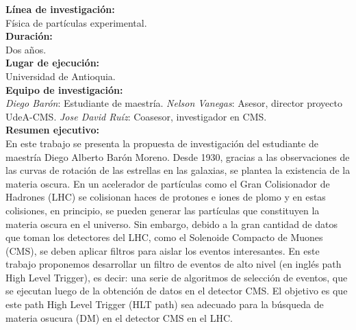 \textbf{Línea de investigación:}\\
Física de partículas experimental.
\\

\textbf{Duración:}\\
Dos años.
\\

\textbf{Lugar de ejecución:}\\
Universidad de Antioquia.
\\

\textbf{Equipo de investigación:}\\
\emph{Diego Barón}: Estudiante de maestría.
\emph{Nelson Vanegas}: Asesor, director proyecto UdeA-CMS.
\emph{Jose David Ruíz}: Coasesor, investigador en CMS.
\\

\textbf{Resumen ejecutivo:}\\
En este trabajo se presenta la propuesta de investigación del estudiante de maestría Diego Alberto Barón Moreno. Desde 1930, gracias a las observaciones de las curvas de rotación de las estrellas en las galaxias, se plantea la existencia de la materia oscura. En un acelerador de partículas como el Gran Colisionador de Hadrones (LHC) se colisionan haces de protones e iones de plomo y en estas colisiones, en principio, se pueden generar las partículas que constituyen la materia oscura en el universo. Sin embargo, debido a la gran cantidad de datos que toman los detectores del LHC, como el Solenoide Compacto de Muones (CMS)\cite{Bayatian:2006nff}, se deben aplicar filtros para aislar los eventos interesantes. En este trabajo proponemos desarrollar un filtro de eventos de alto nivel (en inglés path High Level Trigger), es decir: una serie de algoritmos de selección de eventos, que se ejecutan luego de la obtención de datos en el detector CMS. El objetivo es que este path High Level Trigger (HLT path) sea adecuado para la búsqueda de materia osucura (DM) en el detector CMS en el LHC.


\newpage























